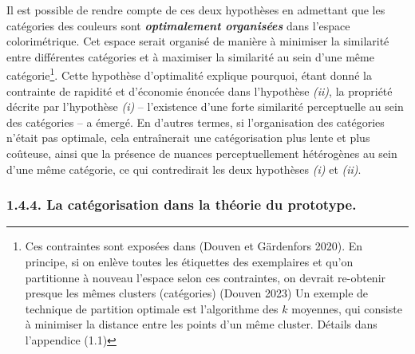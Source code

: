 \documentclass{article}
\newcommand{\bolditalic}[1]{\textbf{\textit{#1}}}
\begin{document}
Il est possible de rendre compte de ces deux hypothèses en admettant que les catégories des couleurs sont \bolditalic{optimalement organisées} dans l'espace colorimétrique. Cet espace serait organisé de manière à minimiser la similarité entre différentes catégories et à maximiser la similarité au sein d'une même catégorie\footnote{Ces contraintes sont exposées dans (Douven et Gärdenfors 2020). En principe, si on enlève toutes les étiquettes des exemplaires et qu’on partitionne à nouveau l'espace selon ces contraintes, on devrait re-obtenir presque les mêmes clusters (catégories) (Douven 2023) Un exemple de technique de partition optimale est l’algorithme des $k$ moyennes, qui consiste à minimiser la distance entre les points d’un même cluster. Détails dans l’appendice (1.1)}. Cette hypothèse d’optimalité explique pourquoi, étant donné la contrainte de rapidité et d’économie énoncée dans l’hypothèse \textit{(ii)}, la propriété décrite par l’hypothèse \textit{(i)} -- l’existence d’une forte similarité perceptuelle au sein des catégories -- a émergé. En d’autres termes, si l’organisation des catégories n’était pas optimale, cela entraînerait une catégorisation plus lente et plus coûteuse, ainsi que la présence de nuances perceptuellement hétérogènes au sein d’une même catégorie, ce qui contredirait les deux hypothèses \textit{(i)} et \textit{(ii)}.

\subsubsection*{1.4.4. 	La catégorisation dans la théorie du prototype.}
\end{document}
